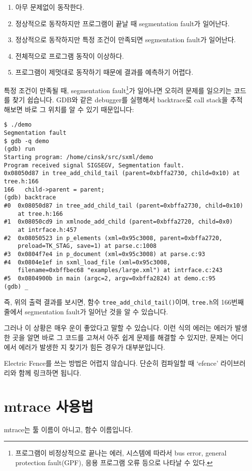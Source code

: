 \begin{enumerate}
\item 아무 문제없이 동작한다.
\item 정상적으로 동작하지만 프로그램이 끝날 때 segmentation fault가 일어난다.
\item 정상적으로 동작하지만 특정 조건이 만족되면 segmentation fault가 일어난다.
\item 전체적으로 프로그램 동작이 이상하다.
\item 프로그램이 제멋대로 동작하기 때문에 결과를 예측하기 어렵다.
\end{enumerate}

특정 조건이 만족될 때, segmentation fault\footnote{프로그램이 비정상적으로 끝나는 에러,
시스템에 따라서 bus error, general protection fault(GPF), 응용 프로그램 오류 등으로
나타날 수 있다.}가 일어나면 오히려 문제를 일으키는 코드를 찾기 쉽습니다. GDB와 같은 debugger를
실행해서 backtrace로 call stack을 추적해보면 바로 그 위치를 알 수 있기 때문입니다:

\begin{verbatim}
$ ./demo
Segmentation fault
$ gdb -q demo
(gdb) run
Starting program: /home/cinsk/src/sxml/demo
Program received signal SIGSEGV, Segmentation fault.
0x08050d87 in tree_add_child_tail (parent=0xbffa2730, child=0x10) at tree.h:166
166	  child->parent = parent;
(gdb) backtrace
#0  0x08050d87 in tree_add_child_tail (parent=0xbffa2730, child=0x10)
    at tree.h:166
#1  0x08050cd9 in xmlnode_add_child (parent=0xbffa2720, child=0x0)
    at intrface.h:457
#2  0x08050523 in p_elements (xml=0x95c3008, parent=0xbffa2720, 
    preload=TK_STAG, save=1) at parse.c:1008
#3  0x0804f7e4 in p_document (xml=0x95c3008) at parse.c:93
#4  0x0804e1ef in sxml_load_file (xml=0x95c3008, 
    filename=0xbffbec68 "examples/large.xml") at intrface.c:243
#5  0x0804900b in main (argc=2, argv=0xbffa2824) at demo.c:95
(gdb) _
\end{verbatim}

즉, 위의 출력 결과를 보시면, 함수 \verb+tree_add_child_tail()+이며, 
\verb+tree.h+의 166번째 줄에서 segmentation fault가 일어난 것을 알 수 있습니다.

그러나 이 상황은 매우 운이 좋았다고 말할 수 있습니다. 이런 식의 에러는 에러가 발생한 곳을 알면
바로 그 코드를 고쳐서 아주 쉽게 문제를 해결할 수 있지만, 문제는 어디에서 에러가 발생한 지 찾기가
힘든 경우가 대부분입니다.


Electric Fence를 쓰는 방법은 어렵지 않습니다. 단순히 컴파일할 때 `efence' 라이브러리와
함께 링크하면 됩니다.

\section{mtrace 사용법}
mtrace는 툴 이름이 아니고, 함수 이름입니다.

%
%
